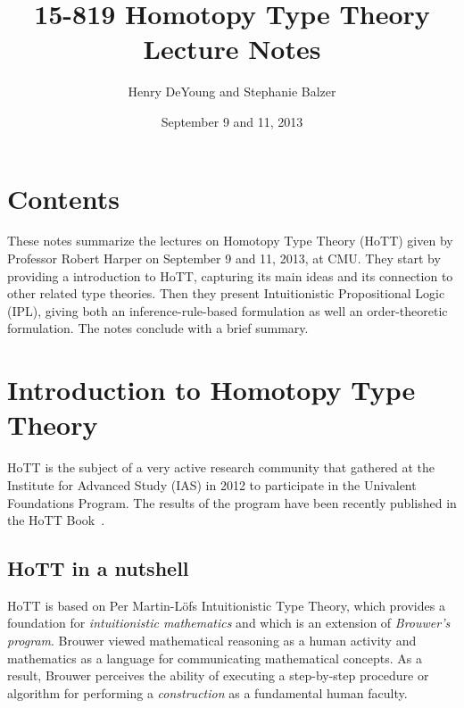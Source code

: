\documentclass[12pt]{article}
\begin{document}
\title{15-819 Homotopy Type Theory\\ Lecture Notes}
\author{Henry DeYoung and Stephanie Balzer}
\date{September 9 and 11, 2013}

\maketitle





\section{Contents}\label{sec:contents}

These notes summarize the lectures on Homotopy Type Theory (HoTT) given by Professor Robert
Harper on September 9 and 11, 2013, at CMU.  They start by providing a introduction to HoTT,
capturing its main ideas and its connection to other related type theories.  Then they present
Intuitionistic Propositional Logic (IPL), giving both an inference-rule-based formulation as
well an order-theoretic formulation.  The notes conclude with a brief summary.


\section{Introduction to Homotopy Type Theory}\label{sec:intro}

%
%
\gls{HoTT} is the subject of a very active research community that gathered at the Institute
for Advanced Study (IAS) in 2012 to participate in the Univalent Foundations Program.  The
results of the program have been recently published in the HoTT Book~\cite{HoTTBook2013}.

\subsection{HoTT in a nutshell}\label{subsec:hott_in_nutshell}

\gls{HoTT} is based on Per Martin-L\"{o}fs Intuitionistic Type Theory, which provides a
foundation for \emph{intuitionistic mathematics} and which is an extension of \emph{Brouwer's
  program}.  Brouwer viewed mathematical reasoning as a human activity and mathematics as a
language for communicating mathematical concepts.  As a result, Brouwer perceives the ability
of executing a step-by-step procedure or algorithm for performing a \emph{construction} as a
fundamental human faculty.
\end{document}
